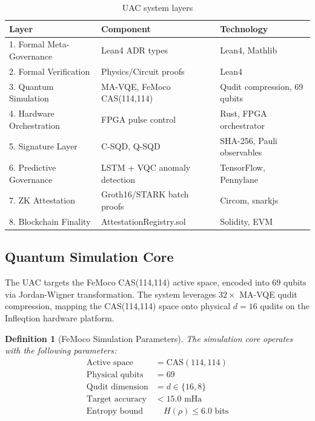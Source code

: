 \documentclass[11pt,a4paper]{article}
\newtheorem{definition}[theorem]{Definition}
\begin{document}
\begin{table}[h]
\centering
\begin{tabular}{lll}
\toprule
\textbf{Layer} & \textbf{Component} & \textbf{Technology} \\
\midrule
1. Formal Meta-Governance & Lean4 ADR types & Lean4, Mathlib \\
2. Formal Verification & Physics/Circuit proofs & Lean4 \\
3. Quantum Simulation & MA-VQE, FeMoco CAS(114,114) & Qudit compression, 69 qubits \\
4. Hardware Orchestration & FPGA pulse control & Rust, FPGA orchestrator \\
5. Signature Layer & C-SQD, Q-SQD & SHA-256, Pauli observables \\
6. Predictive Governance & LSTM + VQC anomaly detection & TensorFlow, Pennylane \\
7. ZK Attestation & Groth16/STARK batch proofs & Circom, snarkjs \\
8. Blockchain Finality & AttestationRegistry.sol & Solidity, EVM \\
\bottomrule
\end{tabular}
\caption{UAC system layers}
\label{tab:layers}
\end{table}

\subsection{Quantum Simulation Core}
The UAC targets the FeMoco CAS(114,114) active space, encoded into 69 qubits via Jordan-Wigner transformation. The system leverages $32\times$ MA-VQE qudit compression, mapping the CAS(114,114) space onto physical $d=16$ qudits on the Infleqtion hardware platform.

\begin{definition}[FeMoco Simulation Parameters]
The simulation core operates with the following parameters:
\begin{align}
    \text{Active space} &= \text{CAS}(114,114) \\
    \text{Physical qubits} &= 69 \\
    \text{Qudit dimension} &= d \in \{16, 8\} \\
    \text{Target accuracy} &< 15.0 \text{ mHa} \\
    \text{Entropy bound} &\quad H(\rho) \leq 6.0 \text{ bits}
\end{align}
\end{definition}
\end{document}
